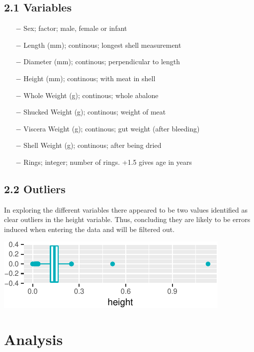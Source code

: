 \documentclass[letterpaper,9pt,twocolumn,twoside,]{pinp}
\begin{document}
\subsection{2.1 Variables}\label{variables}

\begin{itemize}
     \item[$-$] Sex; factor; male, female or infant
     \item[$-$] Length (mm); continous; longest shell measurement
     \item[$-$] Diameter (mm); continous; perpendicular to length
     \item[$-$] Height (mm); continous; with meat in shell
     \item[$-$] Whole Weight (g); continous; whole abalone
     \item[$-$] Shucked Weight (g); continous; weight of meat
     \item[$-$] Viscera Weight (g); continous; gut weight (after bleeding)
     \item[$-$] Shell Weight (g); continous; after being dried
     \item[$-$] Rings; integer; number of rings. +1.5 gives age in years
\end{itemize}

\subsection{2.2 Outliers}\label{outliers}

In exploring the different variables there appeared to be two values
identified as clear outliers in the height variable. Thus, concluding
they are likely to be errors induced when entering the data and will be
filtered out.

\begin{center}\includegraphics{ExecSum_files/figure-latex/unnamed-chunk-1-1} \end{center}

\section{Analysis}\label{analysis}
\end{document}
